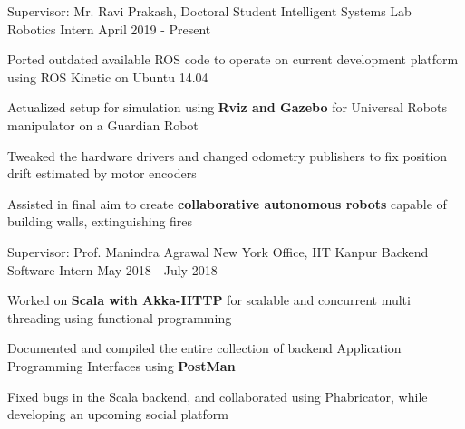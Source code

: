 
\begin{cventries}

  \cventry
    {Supervisor: Mr. Ravi Prakash, Doctoral Student}
    {Intelligent Systems Lab}
    {Robotics Intern}
    {April 2019 - Present}
    {
      \begin{cvitems}
        \item{Ported outdated available ROS code to operate on current development platform using ROS Kinetic on Ubuntu 14.04}
        \item{Actualized setup for simulation using \textbf{Rviz and Gazebo} for Universal Robots manipulator on a Guardian Robot}
        \item{Tweaked the hardware drivers and changed odometry publishers to fix position drift estimated by motor encoders}
        \item{Assisted in final aim to create \textbf{collaborative autonomous robots} capable of building walls, extinguishing fires}
      \end{cvitems}
    }  

  \cventry
    {Supervisor: Prof. Manindra Agrawal}
    {New York Office, IIT Kanpur}
    {Backend Software Intern}
    {May 2018 - July 2018}
    {
      \begin{cvitems}
        \item{Worked on \textbf{Scala with Akka-HTTP} for scalable and concurrent multi threading using functional programming}
        \item{Documented and compiled the entire collection of backend Application Programming Interfaces using \textbf{PostMan}}
        \item{Fixed bugs in the Scala backend, and collaborated using Phabricator, while developing an upcoming social platform}
      \end{cvitems}
    }

\end{cventries}
